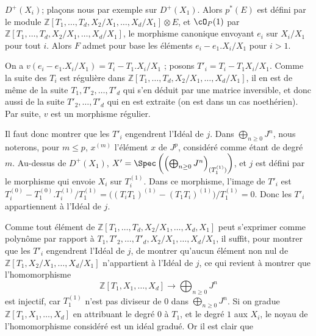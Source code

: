 \(D^+(X_i)\); plaçons nous par exemple sur \(D^+(X_1)\). Alors \(p^*(E)\) est défini par le module \(\mathbb Z[T_1,\ldots,T_d,X_2/X_1,\ldots,X_d/X_1]\otimes E\), et \(\cO_P(1)\) par \(\mathbb Z[T_1,\ldots,T_d,X_2/X_1,\ldots,X_d/X_1]\), le morphisme canonique envoyant \(e_i\) sur \(X_i/X_1\) pour tout \(i\). Alors \(F\) admet pour base les éléments \(e_i-e_1.X_i/X_1\) pour \(i>1\).

On a \(v(e_i-e_1.X_i/X_1)=T_i-T_1.X_i/X_1\) ; posons \(T'_i=T_i-T_1X_i/X_1\).
Comme la suite des \(T_i\) est régulière dans \(\mathbb Z[T_1,\ldots,T_d,X_2/X_1,\ldots,X_d/X_1]\), il en est de même de la suite \(T_1,T'_2,\ldots,T'_d\) qui s'en déduit par une matrice inversible, et donc aussi de la suite \(T'_2,\ldots,T'_d\) qui en est extraite (on est dans un cas noethérien). Par suite, \(v\) est un morphisme régulier.

Il faut donc montrer que les \(T'_i\) engendrent l'Idéal de \(j\). Dans \(\bigoplus_{n\ge0}J^n\), nous noterons, pour \(m\le p\), \(x^{(m)}\) l'élément \(x\) de \(J^p\), considéré comme étant de degré \(m\). Au-dessus de \(D^+(X_1)\), \(X'=\Spec\left(\left(\bigoplus_{n\ge0}J^n\right)_{(T_1^{(1)})}\right)\), et \(j\) est défini par le morphisme qui envoie \(X_i\) sur \(T_i^{(1)}\). Dans ce morphisme, l'image de \(T'_i\) est \(T_i^{(0)}-T_1^{(0)}.T_i^{(1)}/T_1^{(1)}=\bigl((T_iT_1)^{(1)}-(T_1T_i)^{(1)}\bigr)/T_1^{(1)}=0\). Donc les \(T'_i\) appartiennent à l'Idéal de \(j\).

Comme tout élément de \(\mathbb Z[T_1,\ldots,T_d,X_2/X_1,\ldots,X_d,X_1]\) peut s'exprimer comme polynôme par rapport à \(T_1,T'_2,\ldots,T'_d,X_2/X_1,\ldots,X_d/X_1\), il suffit, pour montrer que les \(T'_i\) engendrent l'Idéal de \(j\), de montrer qu'aucun élément non nul de \(\mathbb Z[T_1,X_2/X_1,\ldots,X_d/X_1]\) n'appartient à l'Idéal de \(j\), ce qui revient à montrer que l'homomorphisme
\[
\mathbb Z[T_1,X_1,\ldots,X_d]\longrightarrow\bigoplus_{n\ge0}J^n
\]
est injectif, car \(T_1^{(1)}\) n'est pas diviseur de 0 dans \(\bigoplus_{n\ge0}J^n\). Si on gradue \(\mathbb Z[T_1,X_1,\ldots,X_d]\) en attribuant le degré \(0\) à \(T_1\), et le degré \(1\) aux \(X_i\), le noyau de l'homomorphisme considéré est un idéal gradué. Or il est clair que
